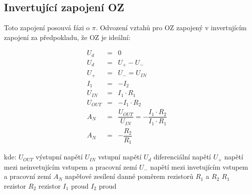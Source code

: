   
    
  \subsection{Invertující zapojení OZ}
    \indent\indent
    Toto zapojení posouvá fázi o $\pi$. Odvození vztahů pro OZ zapojený v invertujícím zapojení za předpokladu, že OZ je ideální:
    
    \begin{eqnarray}
      U_d &=& 0 \nonumber\\
      U_d &=& U_+ - U_- \nonumber\\      
      U_+ &=& U_- = U_{IN} \nonumber\\
      I_1 &=& -I_2 \nonumber\\
      U_{IN} &=& I_1 \cdot R_1 \nonumber\\
      U_{OUT} &=& -I_1 \cdot R_2 \nonumber\\
      A_N &=& \dfrac{U_{OUT}}{U_{IN}} = -\dfrac{I_1 \cdot R_2}{I_1 \cdot R_1} \nonumber\\
      A_N &=& -\dfrac{R_2}{R_1}
    \end{eqnarray} 
    
    \clearpage
    \hspace*{2cm}kde:\newline    
    \hspace*{4cm}$U_{OUT}$ \dotfill výstupní napětí\hspace*{4cm}\newline
    \hspace*{4cm}$U_{IN}$ \dotfill vstupní napětí\hspace*{4cm}\newline
    \hspace*{4cm}$U_d$ \dotfill diferenciální napětí\hspace*{4cm}\newline    
    \hspace*{4cm}$U_+$ \dotfill napětí mezi neinvetujícím vstupem a pracovní zemí\hspace*{4cm}\newline
  	\hspace*{4cm}$U_-$ \dotfill napětí mezi invetujícím vstupem a pracovní zemí\hspace*{4cm}\newline
  	\hspace*{4cm}$A_N$ \dotfill napěťové zesílení danné poměrem rezistorů $R_1$ a $R_2$\hspace*{4cm}\newline
  	\hspace*{4cm}$R_1$ \dotfill rezistor\hspace*{4cm}\newline
  	\hspace*{4cm}$R_2$ \dotfill rezistor\hspace*{4cm}\newline
  	\hspace*{4cm}$I_1$ \dotfill proud\hspace*{4cm}\newline
  	\hspace*{4cm}$I_2$ \dotfill proud\hspace*{4cm}\newline
    
